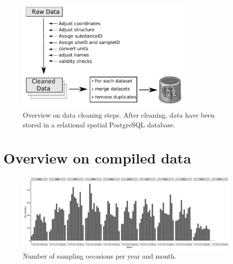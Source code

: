 \documentclass[pdftex,
	a4paper,
	titlepage=false]{scrreprt}
\begin{document}
\begin{figure}[ht]
	\centering
	\includegraphics[width = 0.8\textwidth]{data_cleaning}
	\caption[Overview on data cleaning steps.]{Overview on data cleaning steps. After cleaning, data have been stored in a relational spatial PostgreSQL database.}
	\label{fig:data_cleaning}
\end{figure}



\chapter{Overview on compiled data}


\begin{figure}[ht]
	\centering
	\includegraphics[width = \textwidth]{temporal}
	\caption{Number of sampling occasions per year and month.}
	\label{fig:temporal}
\end{figure}

\end{document}
